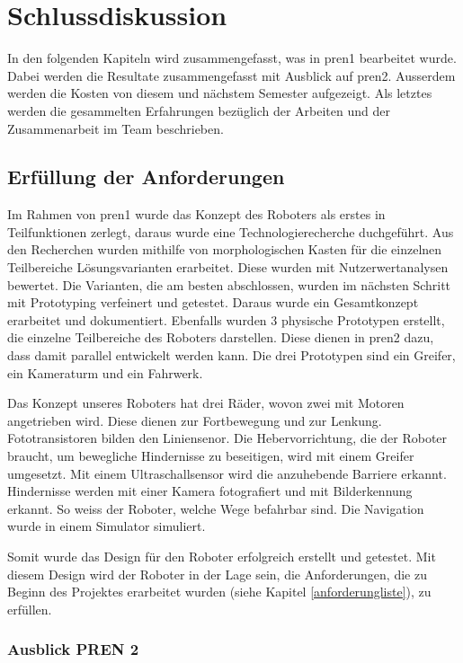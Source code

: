 \section{Schlussdiskussion}

In den folgenden Kapiteln wird zusammengefasst, was in \acrshort{pren1} bearbeitet wurde.
Dabei werden die Resultate zusammengefasst mit Ausblick auf \acrshort{pren2}.
Ausserdem werden die Kosten von diesem und nächstem Semester aufgezeigt.
Als letztes werden die gesammelten Erfahrungen bezüglich der Arbeiten und der Zusammenarbeit im Team beschrieben.

\subsection{Erfüllung der Anforderungen}

Im Rahmen von \acrshort{pren1} wurde das Konzept des Roboters als erstes in Teilfunktionen zerlegt, daraus wurde eine Technologierecherche duchgeführt. Aus den Recherchen wurden mithilfe von morphologischen Kasten für die einzelnen Teilbereiche Lösungsvarianten erarbeitet. Diese wurden mit Nutzerwertanalysen bewertet. Die Varianten, die am besten abschlossen, wurden im nächsten Schritt mit Prototyping verfeinert und getestet. Daraus wurde ein Gesamtkonzept erarbeitet und dokumentiert. Ebenfalls wurden 3 physische Prototypen erstellt, die einzelne Teilbereiche des Roboters darstellen. Diese dienen in \acrshort{pren2} dazu, dass damit parallel entwickelt werden kann. Die drei Prototypen sind ein Greifer, ein Kameraturm und ein Fahrwerk.

Das Konzept unseres Roboters hat drei Räder, wovon zwei mit Motoren angetrieben wird. Diese dienen zur Fortbewegung und zur Lenkung. Fototransistoren bilden den Liniensenor.
Die Hebervorrichtung, die der Roboter braucht, um bewegliche Hindernisse zu beseitigen, wird mit einem Greifer umgesetzt. Mit einem Ultraschallsensor wird die anzuhebende Barriere erkannt. 
Hindernisse werden mit einer Kamera fotografiert und mit Bilderkennung erkannt. So weiss der Roboter, welche Wege befahrbar sind. Die Navigation wurde in einem Simulator simuliert.

Somit wurde das Design für den Roboter erfolgreich erstellt und getestet. Mit diesem Design wird der Roboter in der Lage sein, die Anforderungen, die zu Beginn des Projektes erarbeitet wurden (siehe Kapitel \ref{anforderungliste}), zu erfüllen.

\subsubsection{Ausblick PREN 2}

